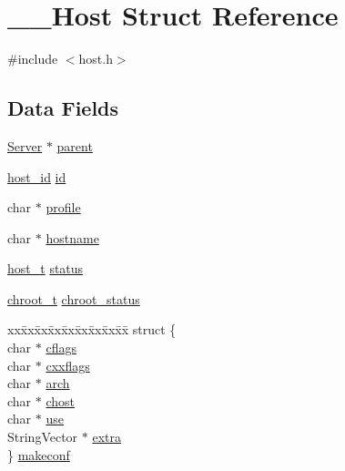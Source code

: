 \hypertarget{struct_____host}{}\section{\+\_\+\+\_\+\+Host Struct Reference}
\label{struct_____host}


{\ttfamily \#include $<$host.\+h$>$}

\subsection*{Data Fields}
\begin{DoxyCompactItemize}
\item 
\mbox{\hyperlink{server_8h_a705d964b8a67edeeb3943273a397e4c2}{Server}} $\ast$ \mbox{\hyperlink{struct_____host_ac050615c8d9d8da7d2cfaffaafd9473d}{parent}}
\item 
\mbox{\hyperlink{host_8h_ad9a5413d8b4376a70706368c97972c2b}{host\+\_\+id}} \mbox{\hyperlink{struct_____host_a2101a62a3859aa1106a2722c659f93c6}{id}}
\item 
char $\ast$ \mbox{\hyperlink{struct_____host_abfbef38d66410fc8705ea35967e65115}{profile}}
\item 
char $\ast$ \mbox{\hyperlink{struct_____host_a3fdd5a6a4e8dc35d72067996674c9ac5}{hostname}}
\item 
\mbox{\hyperlink{host_8h_a1392734739c1e1eba62ebfab3bf7dc92}{host\+\_\+t}} \mbox{\hyperlink{struct_____host_a0a366a15966b166891ba8451009df63d}{status}}
\item 
\mbox{\hyperlink{host_8h_a54b3a4fa9f2eb80339d743f0152bc293}{chroot\+\_\+t}} \mbox{\hyperlink{struct_____host_a6f57f709b8074f8d231036b94806aff7}{chroot\+\_\+status}}
\item 
\begin{tabbing}
xx\=xx\=xx\=xx\=xx\=xx\=xx\=xx\=xx\=\kill
struct \{\\
\>char $\ast$ \mbox{\hyperlink{struct_____host_a94121a0033331d7cdf5425e6d97a74ca}{cflags}}\\
\>char $\ast$ \mbox{\hyperlink{struct_____host_ae241a5f7a25f297926c85a06c4b11c1d}{cxxflags}}\\
\>char $\ast$ \mbox{\hyperlink{struct_____host_a781364a501280f6632f702fc1dceb8e4}{arch}}\\
\>char $\ast$ \mbox{\hyperlink{struct_____host_a73ffa5f9a5dbc9e987f5d804ebc320fa}{chost}}\\
\>char $\ast$ \mbox{\hyperlink{struct_____host_a29d2f3a317a102944ed07955038d827c}{use}}\\
\>StringVector $\ast$ \mbox{\hyperlink{struct_____host_a7b6efbb413eb628ad363c5557da00796}{extra}}\\
\} \mbox{\hyperlink{struct_____host_a5dbb399641e9722e0250871091751972}{makeconf}}\\


\end{tabbing}
\end{DoxyCompactItemize}
